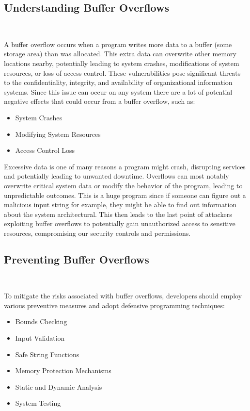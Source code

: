 \documentclass[12pt,a4paper]{report}
\begin{document}
\subsection{Understanding Buffer Overflows}
\

A buffer overflow occurs when a program writes more data to a buffer (some storage area) than was allocated. 
This extra data can overwrite other memory locations nearby, potentially leading to system crashes, modifications of system resources, or loss of access control. 
These vulnerabilities pose significant threats to the confidentiality, integrity, and availability of organizational information systems.
Since this issue can occur on any system there are a lot of potential negative effects that could occur from a buffer overflow, such as:
\begin{itemize}
 \item System Crashes 
 \item Modifying System Resources 
 \item Access Control Loss 
\end{itemize}

Excessive data is one of many reasons a program might crash, disrupting services and potentially leading to unwanted downtime.
Overflows can most notably overwrite critical system data or modify the behavior of the program, leading to unpredictable outcomes.
This is a huge program since if someone can figure out a malicious input string for example, they might be able to find out information about the system architectural.
This then leads to the last point of attackers exploiting buffer overflows to potentially gain unauthorized access to sensitive resources, compromising our security controls and permissions.

\subsection{Preventing Buffer Overflows}
\

To mitigate the risks associated with buffer overflows, developers should employ various preventive measures and adopt defensive programming techniques:

\begin{itemize}
 \item Bounds Checking
 \item Input Validation
 \item Safe String Functions
 \item Memory Protection Mechanisms
 \item Static and Dynamic Analysis
 \item System Testing
\end{itemize}
\end{document}
